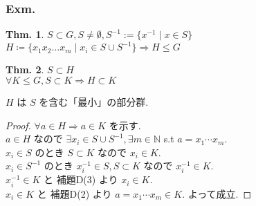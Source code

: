 \documentclass[uplatex,dvipdfmx,9pt]{beamer}
\newcounter{textExmCount}
\theoremstyle{definition} %
\newtheorem{thm}{Thm.}[subsection] %
\theoremstyle{example}
\begin{document}
      \addtocounter{textExmCount}{1}
      \begin{frame}
        \frametitle{Exm. \thetextExmCount}

        \begin{thm}
          $S \subset G, S \ne \emptyset, S^{-1} := \{ x^{-1} \mid x \in S \}$ \\
          $H \coloneqq \{ x_1 x_2 \dots x_m \mid x_i \in S \cup S^{-1} \} \Rightarrow H \le G$
        \end{thm}

        \begin{thm}
          $S \subset H$ \\
          $\forall K \le G, S \subset K \Rightarrow H \subset K$
        \end{thm}
        $H$ は $S$ を含む「最小」の部分群. \\

        \begin{proof}
          $\forall a \in H \Rightarrow a \in K$ を示す. \\
          $a \in H$ なので $\exists x_i \in S \cup S^{-1}, \exists m \in \mathbb{N}$ s.t $a = x_1 \cdots x_m$. \\
          $x_i \in S$ のとき $S \subset K$ なので $x_i \in K$. \\
          $x_i \in S^{-1}$ のとき $x^{-1}_i \in S, S \subset K$ なので $x^{-1}_i \in K$. \\
          $x^{-1}_i \in K$ と 補題D(3) より $x_i \in K$. \\
          $x_i \in K$ と 補題D(2) より $a = x_1 \cdots x_m \in K$. よって成立.
        \end{proof}

      \end{frame}
\end{document}
